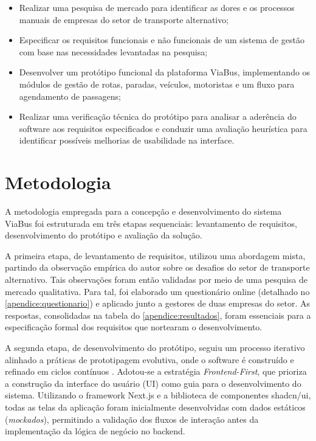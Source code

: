 \begin{itemize}
  \item Realizar uma pesquisa de mercado para identificar as dores e os processos manuais de empresas do setor de transporte alternativo;

  \item Especificar os requisitos funcionais e não funcionais de um sistema de gestão com base nas necessidades levantadas na pesquisa;

  \item Desenvolver um protótipo funcional da plataforma ViaBus, implementando os módulos de gestão de rotas, paradas, veículos, motoristas e um fluxo para agendamento de passagens;

  \item Realizar uma verificação técnica do protótipo para analisar a aderência do software aos requisitos especificados e conduzir uma avaliação heurística para identificar possíveis melhorias de usabilidade na interface.
\end{itemize}

\section{Metodologia}

A metodologia empregada para a concepção e desenvolvimento do sistema ViaBus foi estruturada em três etapas sequenciais: levantamento de requisitos, desenvolvimento do protótipo e avaliação da solução.

A primeira etapa, de levantamento de requisitos, utilizou uma abordagem mista, partindo da observação empírica do autor sobre os desafios do setor de transporte alternativo. Tais observações foram então validadas por meio de uma pesquisa de mercado qualitativa. Para tal, foi elaborado um questionário online (detalhado no \autoref{apendice:questionario}) e aplicado junto a gestores de duas empresas do setor. As respostas, consolidadas na tabela do \autoref{apendice:resultados}, foram essenciais para a especificação formal dos requisitos que nortearam o desenvolvimento.

A segunda etapa, de desenvolvimento do protótipo, seguiu um processo iterativo alinhado a práticas de prototipagem evolutiva, onde o software é construído e refinado em ciclos contínuos \cite{sommerville2011software}. Adotou-se a estratégia \textit{Frontend-First}, que prioriza a construção da interface do usuário (UI) como guia para o desenvolvimento do sistema. Utilizando o framework Next.js e a biblioteca de componentes shadcn/ui, todas as telas da aplicação foram inicialmente desenvolvidas com dados estáticos (\textit{mockados}), permitindo a validação dos fluxos de interação antes da implementação da lógica de negócio no backend.

